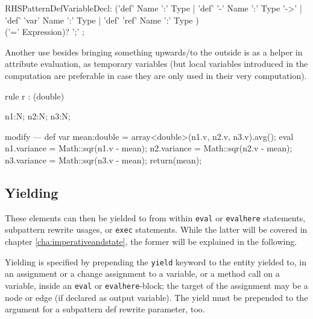 \begin{rail} 
  RHSPatternDefVariableDecl: 
	('def' Name ':' Type |
	'def' '-' Name ':' Type '->' |
	'def' 'var' Name ':' Type |
	'def' 'ref' Name ':' Type ) \\
	('=' Expression)? ';'
	;
\end{rail}

Another use besides bringing something upwards/to the outside is as a helper in attribute evaluation,
as temporary variables (but local variables introduced in the computation are preferable in case they are only used in their very computation).

\begin{example}
  \begin{grgen}
rule r : (double) {
  n1:N; n2:N; n3:N;
  
  modify {
  ---
    def var mean:double = array<double>(n1.v, n2.v, n3.v).avg();
    eval {
      n1.variance = Math::sqr(n1.v - mean); 
      n2.variance = Math::sqr(n2.v - mean); 
      n3.variance = Math::sqr(n3.v - mean); 
    }
    return(mean);
  }
}
  \end{grgen}
\end{example}

\subsection{Yielding}\label{sub:yield} 

These elements can then be yielded to from within \texttt{eval} or \texttt{evalhere} statements, subpattern rewrite usages, or \texttt{exec} statements.
While the latter will be covered in chapter \ref{cha:imperativeandstate}, the former will be explained in the following.

Yielding is specified by prepending the \texttt{yield} keyword to the entity yielded to,
in an assignment or a change assignment to a variable, or a method call on a variable,
inside an \texttt{eval} or \texttt{evalhere}-block; 
the target of the assignment may be a node or edge (if declared as output variable).
The yield must be prepended to the argument for a subpattern def rewrite parameter, too.

